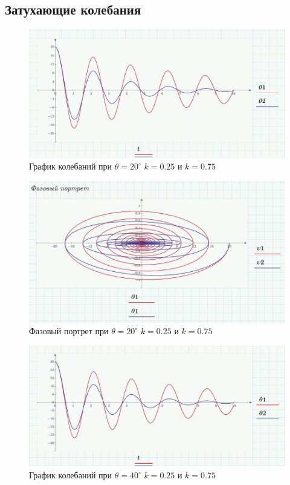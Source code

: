 \documentclass[a4paper, 14pt]{extarticle}
\begin{document}
	\subsection{Затухающие колебания}	
		\begin{figure}[H]
			\centering
			\includegraphics[width = \linewidth]{11.jpg}
			\caption[.] {График колебаний при $\theta = 20^{\circ}$ $k = 0.25$ и $k=0.75$}
		\end{figure}
		\begin{figure}[H]
			\centering
			\includegraphics[width = \linewidth]{12.jpg}
			\caption[.] {Фазовый портрет при $\theta = 20^{\circ}$ $k = 0.25$ и $k=0.75$}
		\end{figure}
		\begin{figure}[H]
			\centering
			\includegraphics[width = \linewidth]{14.jpg}
			\caption[.] {График колебаний при $\theta = 40^{\circ}$ $k = 0.25$ и $k=0.75$}
		\end{figure}
\end{document}
